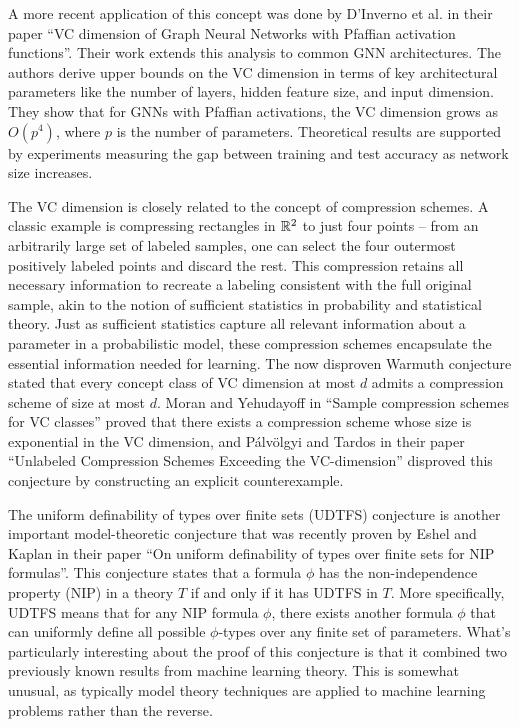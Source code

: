 \begin{outline}
    \1 A more recent application of this concept was done by D'Inverno et al. in their paper \enquote{VC dimension of Graph Neural Networks with Pfaffian activation functions}. Their work extends this analysis to common GNN architectures. The authors derive upper bounds on the VC dimension in terms of key architectural parameters like the number of layers, hidden feature size, and input dimension.  They show that for GNNs with Pfaffian activations, the VC dimension grows as $O(p^4)$, where $p$ is the number of parameters. Theoretical results are supported by experiments measuring the gap between training and test accuracy as network size increases. 

    \1 The VC dimension is closely related to the concept of compression schemes. A classic example is compressing rectangles in $\mathbb{R}^2$ to just four points -- from an arbitrarily large set of labeled samples, one can select the four outermost positively labeled points and discard the rest. This compression retains all necessary information to recreate a labeling consistent with the full original sample, akin to the notion of sufficient statistics in probability and statistical theory. Just as sufficient statistics capture all relevant information about a parameter in a probabilistic model, these compression schemes encapsulate the essential information needed for learning.
    The now disproven Warmuth conjecture stated that every concept class of VC dimension at most $d$ admits a compression scheme of size at most $d$.  Moran and Yehudayoff in \enquote{Sample compression schemes for VC classes} proved that there exists a compression scheme whose size is exponential in the VC dimension, and Pálvölgyi and Tardos in their paper \enquote{Unlabeled Compression Schemes Exceeding the VC-dimension} disproved this conjecture by constructing an explicit counterexample.
    
    \1 The uniform definability of types over finite sets (UDTFS) conjecture is another important model-theoretic conjecture that was recently proven by Eshel and Kaplan in their paper \enquote{On uniform definability of types over finite sets for NIP formulas}.  This conjecture states that a formula $\phi$ has the non-independence property (NIP) in a theory $T$ if and only if it has UDTFS in $T$. More specifically, UDTFS means that for any NIP formula $\phi$, there exists another formula $\phi$ that can uniformly define all possible $\phi$-types over any finite set of parameters.
    What's particularly interesting about the proof of this conjecture is that it combined two previously known results from machine learning theory. This is somewhat unusual, as typically model theory techniques are applied to machine learning problems rather than the reverse.
    

\end{outline}
